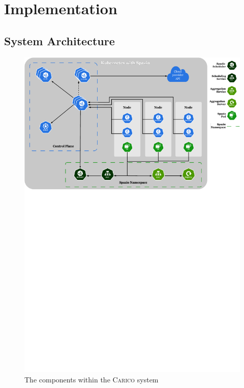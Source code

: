 \chapter{Implementation}

\section{System Architecture}
\label{sec:sys-arch}

\begin{figure}[ht]
    \centering
    \includegraphics[width=\textwidth]{images/carico-svg.pdf}
    \caption{The components within the \textsc{Carico} system}
    \label{fig:spazio-system}
\end{figure}

